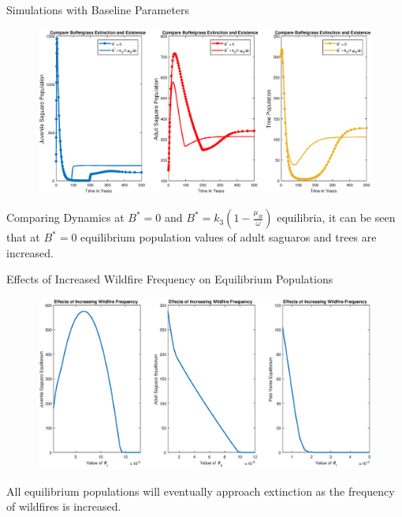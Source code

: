 \documentclass{beamer}
\begin{document}
\begin{frame}{Simulations with Baseline Parameters}
\begin{figure}
\includegraphics[scale = 0.3]{WandWoutBbyPop.eps}
\end{figure}
\small{Comparing Dynamics at $B^* = 0$ and $B^* = k_3\left(1 - \displaystyle\frac{\mu_B}{\omega}\right)$ equilibria, it can be seen that at $B^* = 0$ equilibrium population values of adult saguaros and  trees are increased.}
\end{frame}

\begin{frame}{Effects of Increased Wildfire Frequency on Equilibrium Populations}
\begin{figure}
\includegraphics[scale = 0.3]{EqPopVsTheta.eps}
\end{figure}
All equilibrium populations will eventually approach extinction as the frequency of wildfires is increased.
\end{frame}
\end{document}
